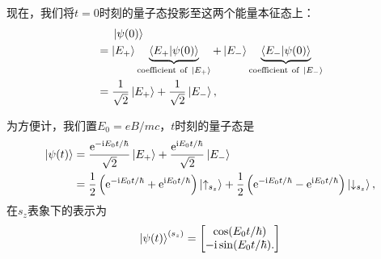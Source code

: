 \begin{tcolorbox}[breakable, title={\textbf{自旋}}]
    现在，我们将$t=0$时刻的量子态投影至这两个能量本征态上：
    \begin{equation}
    \begin{aligned}
        & \quad\ \ket{\psi(0)} \\
        &= \ket{E_+} \underbrace{{\braket{E_+}{\psi(0)}}}_{\rm{coefficient\ of\ }\ket{E_+}} + \ket{E_-} \underbrace{\braket{E_-}{\psi(0)}}_{\rm{coefficient\ of\ }\ket{E_-}} \\
        &= \frac{1}{\sqrt{2}} \ket{E_+} + \frac{1}{\sqrt{2}} \ket{E_-},
    \end{aligned}
    \end{equation}

    为方便计，我们置$E_0 = eB/mc$，$t$时刻的量子态是
    \begin{equation}
    \begin{aligned}
        \ket{\psi(t)}
        &= \frac{\mathrm{e}^{-\mathrm{i} E_0 t/\hbar}}{\sqrt{2}} \ket{E_+} + \frac{\mathrm{e}^{\mathrm{i} E_0 t/\hbar}}{\sqrt{2}} \ket{E_-} \\
        &= \frac12 \left(\mathrm{e}^{-\mathrm{i} E_0 t/\hbar} + \mathrm{e}^{\mathrm{i} E_0 t/\hbar}\right) \ket{\uparrow_{s_z}} + \frac12 \left(\mathrm{e}^{-\mathrm{i} E_0 t/\hbar} - \mathrm{e}^{\mathrm{i} E_0 t/\hbar}\right) \ket{\downarrow_{s_z}},
    \end{aligned}
    \end{equation}
    在$s_z$表象下的表示为
    \begin{equation}
        \ket{\psi(t)}^{(s_z)} =
        \begin{bmatrix}
            \cos(E_0 t/\hbar) \\ -\mathrm{i}\sin(E_0 t/\hbar).
        \end{bmatrix}
    \end{equation}


\end{tcolorbox}
